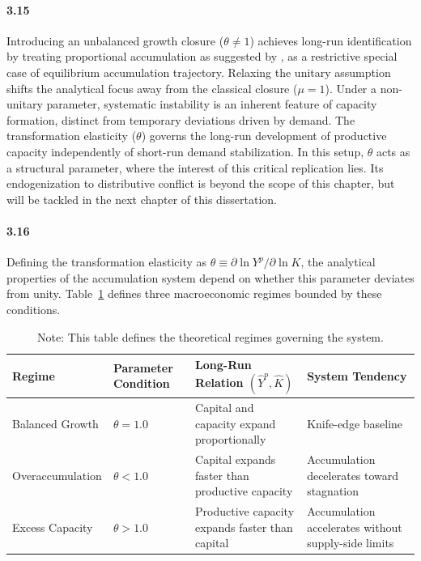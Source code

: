 \paragraph{3.15}
Introducing an unbalanced growth closure ($\theta \neq 1$) achieves long-run identification by treating proportional accumulation as suggested by \citet{Okishio2022}, as a restrictive special case of equilibrium accumulation trajectory. Relaxing the unitary assumption shifts the analytical focus away from the classical closure ($\mu = 1$). Under a non-unitary parameter, systematic instability is an inherent feature of capacity formation, distinct from temporary deviations driven by demand. The transformation elasticity ($\theta$) governs the long-run development of productive capacity independently of short-run demand stabilization. In this setup, $\theta$ acts as a structural parameter, where the interest of this critical replication lies. Its endogenization to distributive conflict is beyond the scope of this chapter, but will be tackled in the next chapter of this dissertation.

\paragraph{3.16}
Defining the transformation elasticity as $\theta \equiv \partial \ln Y^p / \partial \ln K$, the analytical properties of the accumulation system depend on whether this parameter deviates from unity. Table~\ref{tab:growth_regimes} defines three macroeconomic regimes bounded by these conditions.

\begin{table}[H]
\centering
\caption{Accumulation Regimes and the Productive-Capacity Relation}
\label{tab:growth_regimes}
\small
\begin{tabular}{@{}>{\raggedright\arraybackslash}p{3.2cm}>{\centering\arraybackslash}p{1.8cm}>{\raggedright\arraybackslash}p{4.2cm}>{\raggedright\arraybackslash}p{4.0cm}@{}}
\toprule
Regime & Parameter Condition & Long-Run Relation $(\hat{Y}^p,\hat{K})$ & System Tendency \\
\midrule
\midrule
Balanced Growth & $\theta = 1.0$ & Capital and capacity expand proportionally & Knife-edge baseline \\
Overaccumulation & $\theta < 1.0$ & Capital expands faster than productive capacity & Accumulation decelerates toward stagnation \\
Excess Capacity & $\theta > 1.0$ & Productive capacity expands faster than capital & Accumulation accelerates without supply-side limits \\
\bottomrule
\end{tabular}
\caption*{\footnotesize Note: This table defines the theoretical regimes governing the system.}
\end{table}

